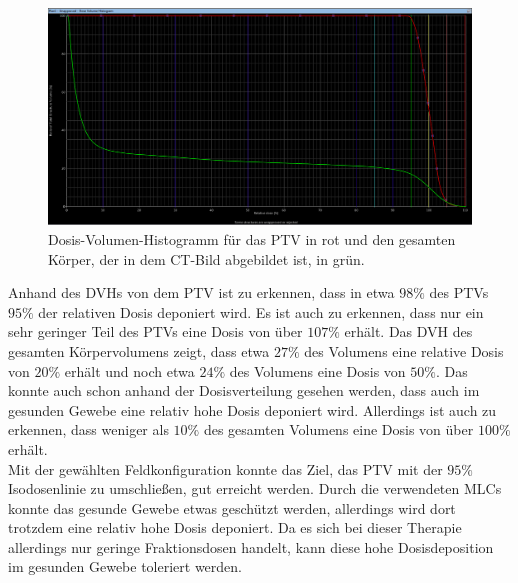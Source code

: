 \begin{figure}[H]
  \centering
  \includegraphics[width=\textwidth]{Bilder/DVH_HüfteEinzel.png}
  \caption{Dosis-Volumen-Histogramm für das PTV in rot und den gesamten Körper, der in dem CT-Bild abgebildet ist, in grün.}
  \label{abb:DVH}
\end{figure}

Anhand des DVHs von dem PTV ist zu erkennen, dass in etwa $98\%$ des PTVs $95\%$ der relativen Dosis deponiert wird. Es
ist auch zu erkennen, dass nur ein sehr geringer Teil des PTVs eine Dosis von über $107\%$ erhält.
Das DVH des gesamten Körpervolumens zeigt, dass etwa $27\%$ des Volumens eine relative Dosis von $20\%$ erhält und noch etwa $24\%$ des Volumens
eine Dosis von $50\%$. Das konnte auch schon anhand der Dosisverteilung gesehen werden, dass auch im gesunden Gewebe eine relativ hohe Dosis deponiert wird.
Allerdings ist auch zu erkennen, dass weniger als $10\%$ des gesamten Volumens eine Dosis von über $100\%$ erhält. \\

Mit der gewählten Feldkonfiguration konnte das Ziel, das PTV mit der $95\%$ Isodosenlinie zu umschließen, gut erreicht werden.
Durch die verwendeten MLCs konnte das gesunde Gewebe etwas geschützt werden, allerdings wird dort trotzdem eine
relativ hohe Dosis deponiert. Da es sich bei dieser Therapie allerdings nur geringe Fraktionsdosen handelt,
kann diese hohe Dosisdeposition im gesunden Gewebe toleriert werden. 
